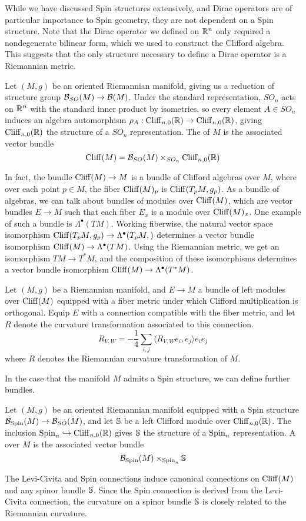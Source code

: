 While we have discussed Spin structures extensively, and Dirac operators are
of particular importance to Spin geometry, they are not dependent on a Spin structure.
Note that the Dirac operator we defined on $\R^n$ only required a nondegenerate
bilinear form, which we used to construct the Clifford algebra. This suggests
that the only structure necessary to define a Dirac operator is a Riemannian metric.
%
\begin{defn}
Let $(M,g)$ be an oriented Riemannian manifold, giving us a reduction of structure
group $\B_{SO}(M) \to \B(M)$. Under the standard representation, $SO_n$ acts on $\R^n$
with the standard inner product by isometries, so every element $A \in SO_n$ induces
an algebra automorphism  $\rho_A : \Cliff_{n,0}(\R) \to \Cliff_{n,0}(\R)$, giving
$\Cliff_{n,0}(\R)$ the structure of a $SO_n$ representation. The 
of $M$ is the associated vector bundle
\[
\Cliff(M) = \B_{SO}(M) \times_{SO_n} \Cliff_{n,0}(\R)
\]
\end{defn}
%
In fact, the bundle $\Cliff(M) \to M$ is a bundle of Clifford algebras over $M$, where
over each point $p \in M$, the fiber $\Cliff(M)_p$ is $\Cliff(T_pM, g_p)$.
As a bundle of algebras, we can talk about bundles of modules over $\Cliff(M)$, which
are vector bundles $E \to M$ such that each fiber $E_x$ is a module over $\Cliff(M)_x$.
One example of such a bundle is $\Lambda^\bullet(TM)$. Working
fiberwise, the natural vector space isomorphism
$\Cliff(T_pM, g_p) \to \Lambda^\bullet(T_pM,)$ determines  a vector bundle isomorphism
$\Cliff(M) \to \Lambda^\bullet(TM)$. Using the Riemannian metric, we get an isomorphism
$TM \to T^*M$, and the composition of these isomorphisms determines a vector bundle
isomorphism $\Cliff(M) \to \Lambda^\bullet(T^*M)$.
%
\begin{prop}
Let $(M,g)$ be a Riemannian manifold, and $E \to M$ a bundle of left modules over
$\Cliff(M)$ equipped with a fiber metric under which Clifford multiplication is
orthogonal. Equip $E$ with a connection compatible with the fiber metric, and let
$R$ denote the curvature transformation associated to this connection.
\[
R_{V,W} = -\frac{1}{4}\sum_{i, j}\langle R_{V,W}e_i, e_j \rangle e_ie_j
\]
where $R$ denotes the Riemannian curvature transformation of $M$.
\end{prop}
%
In the case that the manifold $M$ admits a Spin structure, we can define further bundles.
%
\begin{defn}
Let $(M,g)$ be an oriented Riemannian manifold equipped with a Spin structure
$\B_{\Spin}(M) \to \B_{SO}(M)$, and let $\S$ be a left Clifford module over
$\Cliff_{n,0}(\R)$. The inclusion $\Spin_n \hookrightarrow \Cliff_{n,0}(\R)$ gives $\S$
the structure of a $\Spin_n$ representation. A  over $M$ is the
associated vector bundle
\[
\B_\Spin(M) \times_{\Spin_n} \S
\]
\end{defn}
%
The Levi-Civita and Spin connections induce canonical connections on $\Cliff(M)$ and
any spinor bundle $\S$. Since the Spin connection is derived from the Levi-Civita
connection, the curvature on a spinor bundle $\S$ is closely related to the
Riemannian curvature. \\
%

